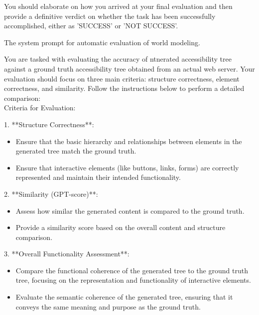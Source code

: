 \documentclass[11pt]{article}
\begin{document}
\begin{tcolorbox}[colback=blue!5!white, colframe=blue!75!black, breakable, title = {\textsc{Automatic Evaluation}}]
You should elaborate on how you arrived at your final evaluation and then provide a definitive verdict on whether the task has been successfully accomplished, either as 'SUCCESS' or 'NOT SUCCESS'.

\end{tcolorbox}


The system prompt for automatic evaluation of world modeling.

\begin{tcolorbox}[colback=blue!5!white, colframe=blue!75!black, breakable, title = {\textsc{World Model Intrinsic Evaluation}}]\label{prompt:wm_inherent}

\ttfamily
\small

You are tasked with evaluating the accuracy of ntnerated accessibility tree against a ground truth accessibility tree obtained from an actual web server. Your evaluation should focus on three main criteria: structure correctness, element correctness, and similarity. Follow the instructions below to perform a detailed comparison:\\

Criteria for Evaluation:

1. **Structure Correctness**:
\begin{itemize}[leftmargin=*]
   \item  Ensure that the basic hierarchy and relationships between elements in the generated tree match the ground truth.
   \item Ensure that interactive elements (like buttons, links, forms) are correctly represented and maintain their intended functionality.
\end{itemize}


2. **Similarity (GPT-score)**:
\begin{itemize}[leftmargin=*]
   \item Assess how similar the generated content is compared to the ground truth.
   \item Provide a similarity score based on the overall content and structure comparison.
\end{itemize}


3. **Overall Functionality Assessment**:

\begin{itemize}[leftmargin=*]
   \item Compare the functional coherence of the generated tree to the ground truth tree, focusing on the representation and functionality of interactive elements.
   \item Evaluate the semantic coherence of the generated tree, ensuring that it conveys the same meaning and purpose as the ground truth.
\end{itemize}



\end{tcolorbox}
\end{document}
